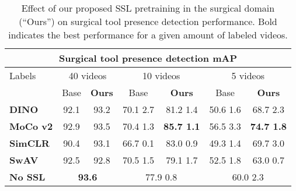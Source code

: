 \documentclass[times,twocolumn,final]{elsarticle}
\begin{document}
\begin{table*}[th!]
  \centering
  \caption{Effect of our proposed SSL pretraining in the surgical domain (``Ours'') on surgical tool presence detection performance. Bold indicates the best performance for a given amount of labeled videos.}
  \label{tab:tool_main}
  \begin{tabular*}{\textwidth}{l @{\extracolsep{\fill}}cccccc}
  \hline
  \multicolumn{7}{c}{\textbf{Surgical tool presence detection mAP}}                      \\ \hline
  Labels & \multicolumn{2}{c}{40 videos} & \multicolumn{2}{c}{10 videos} & \multicolumn{2}{c}{5 videos} \\ \hline
         & Base    & \textbf{Ours}   & Base   & \textbf{Ours}   & Base    & \textbf{Ours}    \\
  \textbf{DINO}   &92.1& 93.2& 70.1  2.7 & 81.2  1.4 & 50.6  1.6 & 68.7  2.3\\
  \textbf{MoCo v2}   &92.9& 93.5& 70.4  1.3 & \textbf{85.7  1.1} & 56.5  3.3 & \textbf{74.7  1.8}\\
  \textbf{SimCLR} &90.4& 93.1& 66.7  0.1 & 83.0  0.9 & 49.3  1.4 & 69.7  3.0\\
  \textbf{SwAV}   &92.5& 92.8& 70.5  1.5 & 79.1  1.7 & 52.5  1.8 & 63.0  0.7\\ \hline
  \textbf{No SSL} & \multicolumn{2}{c}{\textbf{93.6}}      & \multicolumn{2}{c}{77.9  0.8}     & \multicolumn{2}{c}{60.0  2.3}\\ \hline
  \end{tabular*}
\end{table*}
\end{document}
